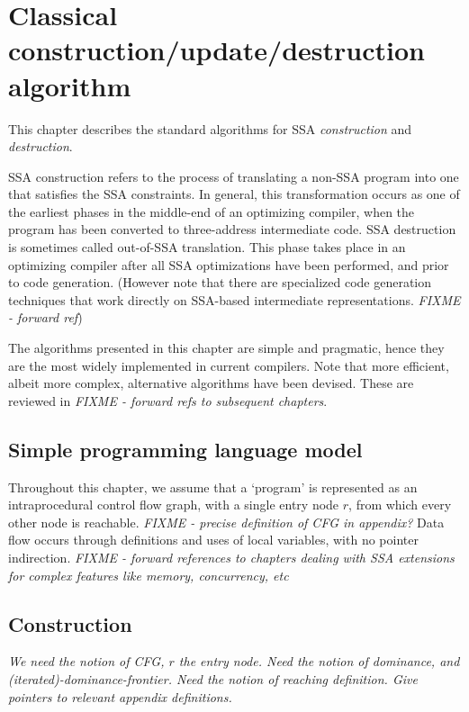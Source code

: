 \chapter{Classical construction/update/destruction algorithm }

{
\def\phiops{$\phi$-functions}
\def\phiop{$\phi$-function}


This chapter describes the standard algorithms for SSA \textit{construction} and
\textit{destruction}.

SSA construction refers to the process of translating a non-SSA program into
one that satisfies the SSA constraints. In general, this transformation
occurs as one of the
earliest phases in the middle-end of an optimizing compiler, when the program
has been converted to three-address intermediate code.
SSA destruction is sometimes called out-of-SSA translation. This phase
takes place in an optimizing compiler after all SSA optimizations have
been performed, and prior to code generation. (However note that there are
specialized code generation techniques that work directly on SSA-based
intermediate representations. \emph{FIXME - forward ref})

The algorithms presented in this chapter are simple and pragmatic, hence they
are the most widely implemented in current compilers. Note that more
efficient, albeit more complex, alternative algorithms have been devised.
These are reviewed in \emph{FIXME - forward refs to subsequent chapters}.

\section{Simple programming language model}

Throughout this chapter,
we assume that a `program' is represented as an
intraprocedural control flow graph,
with a single entry node $r$, from which every other
node is reachable.
\emph{FIXME - precise definition of CFG in appendix?}
Data flow occurs through definitions and uses of 
local variables, with no pointer indirection.
\emph{FIXME - forward references to chapters dealing with
SSA extensions for complex features like memory, concurrency, etc}



\section{Construction}
{\em We need the notion of CFG, $r$ the entry node. Need the notion of
  dominance, and (iterated)-dominance-frontier. Need the notion of reaching
  definition. Give pointers to relevant appendix definitions.}


}
